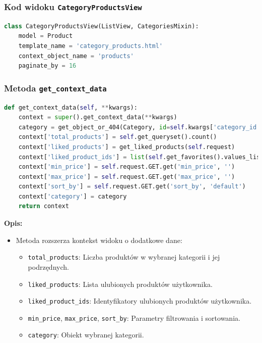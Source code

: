 \documentclass[12pt,a4paper,oneside]{article}
\theoremstyle{definition}
\numberwithin{equation}{section}
\begin{document}
\subsubsection*{Kod widoku \texttt{CategoryProductsView}}
\begin{lstlisting}[language=Python, caption=Kod widoku \texttt{CategoryProductsView}]
class CategoryProductsView(ListView, CategoriesMixin):
    model = Product
    template_name = 'category_products.html'
    context_object_name = 'products'
    paginate_by = 16
\end{lstlisting}

\subsubsection*{Metoda \texttt{get\_context\_data}}
\begin{lstlisting}[language=Python, caption=Metoda \texttt{get\_context\_data}]
def get_context_data(self, **kwargs):
    context = super().get_context_data(**kwargs)
    category = get_object_or_404(Category, id=self.kwargs['category_id'])
    context['total_products'] = self.get_queryset().count()
    context['liked_products'] = get_liked_products(self.request)
    context['liked_product_ids'] = list(self.get_favorites().values_list('id', flat=True))
    context['min_price'] = self.request.GET.get('min_price', '')
    context['max_price'] = self.request.GET.get('max_price', '')
    context['sort_by'] = self.request.GET.get('sort_by', 'default')
    context['category'] = category
    return context
\end{lstlisting}
\textbf{Opis:}
\begin{itemize}
    \item Metoda rozszerza kontekst widoku o dodatkowe dane:
    \begin{itemize}
        \item \texttt{total\_products}: Liczba produktów w wybranej kategorii i jej podrzędnych.
        \item \texttt{liked\_products}: Lista ulubionych produktów użytkownika.
        \item \texttt{liked\_product\_ids}: Identyfikatory ulubionych produktów użytkownika.
        \item \texttt{min\_price}, \texttt{max\_price}, \texttt{sort\_by}: Parametry filtrowania i sortowania.
        \item \texttt{category}: Obiekt wybranej kategorii.
    \end{itemize}
\end{itemize}
\end{document}
